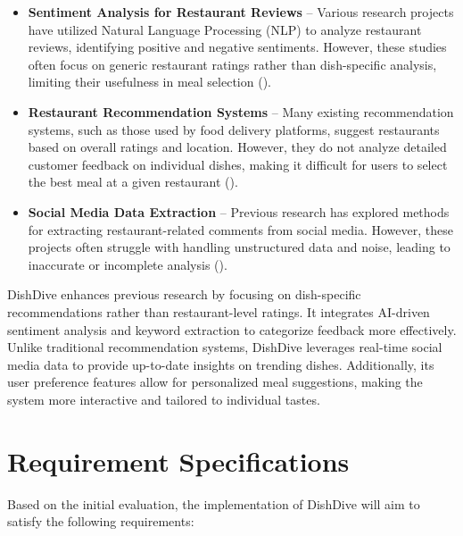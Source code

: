 \begin{itemize}
\item \textbf{Sentiment Analysis for Restaurant Reviews} – Various research projects have utilized Natural Language Processing (NLP) to analyze restaurant reviews, identifying positive and negative sentiments. However, these studies often focus on generic restaurant ratings rather than dish-specific analysis, limiting their usefulness in meal selection (\parencite{Zahrah2024}).
\item \textbf{Restaurant Recommendation Systems} – Many existing recommendation systems, such as those used by food delivery platforms, suggest restaurants based on overall ratings and location. However, they do not analyze detailed customer feedback on individual dishes, making it difficult for users to select the best meal at a given restaurant (\parencite{Greene2024}).
\item \textbf{Social Media Data Extraction} – Previous research has explored methods for extracting restaurant-related comments from social media. However, these projects often struggle with handling unstructured data and noise, leading to inaccurate or incomplete analysis (\parencite{Shin2022}).
\end{itemize}

DishDive enhances previous research by focusing on dish-specific recommendations rather than restaurant-level ratings. It integrates AI-driven sentiment analysis and keyword extraction to categorize feedback more effectively. Unlike traditional recommendation systems, DishDive leverages real-time social media data to provide up-to-date insights on trending dishes. Additionally, its user preference features allow for personalized meal suggestions, making the system more interactive and tailored to individual tastes.

\section{Requirement Specifications}
Based on the initial evaluation, the implementation of DishDive will aim to satisfy the following requirements:

